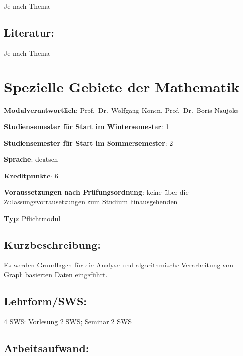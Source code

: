 Je nach Thema

\section*{Literatur:}\label{literatur-1}

Je nach Thema

\chapter{Spezielle Gebiete der
Mathematik}\label{spezielle-gebiete-der-mathematik}

\begin{modulHead}
\textbf{Modulverantwortlich}: Prof.~Dr.~Wolfgang
Konen, Prof.~Dr.~Boris
Naujoks
\end{modulHead}
\begin{modulHead}
\textbf{Studiensemester für
Start im Wintersemester}:
1
\end{modulHead}
\begin{modulHead}
\textbf{Studiensemester für Start
im Sommersemester}:
2
\end{modulHead}
\begin{modulHead}
\textbf{Sprache}:
deutsch
\end{modulHead}
\begin{modulHead}
\textbf{Kreditpunkte}:
6
\end{modulHead}
\begin{modulHead}
\textbf{Voraussetzungen nach
Prüfungsordnung}: keine über die Zulassungsvorrausetzungen zum Studium
hinausgehenden
\end{modulHead}
\begin{modulHead}
\textbf{Typ}:
Pflichtmodul
\end{modulHead}


\section*{Kurzbeschreibung:}\label{kurzbeschreibung-1}

Es werden Grundlagen für die Analyse und algorithmische Verarbeitung von
Graph basierten Daten eingeführt.

\section*{Lehrform/SWS:}\label{lehrformsws-2}

4 SWS: Vorlesung 2 SWS; Seminar 2 SWS

\section*{Arbeitsaufwand:}\label{arbeitsaufwand-2}

